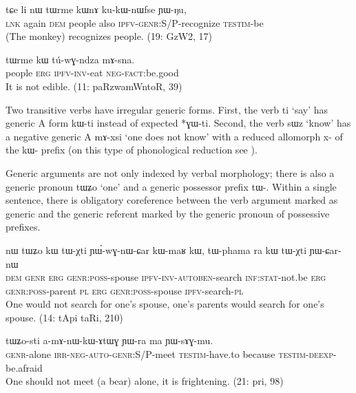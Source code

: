 \documentclass[oldfontcommands,oneside,a4paper,11pt]{article}
\newcommand{\ipa}[1]{{\phon \mbox{#1}}} %
\begin{document}
\begin{exe}
\ex \label{ex:kukWnWfse}
\gll
\ipa{tɕe}  	\ipa{li}  	\ipa{nɯ}  	\ipa{tɯrme}  	\ipa{kɯnɤ}  	\ipa{ku-kɯ-nɯfse}  	\ipa{ɲɯ-ŋu,}\\
\textsc{lnk} again \textsc{dem} people also \textsc{ipfv-genr:S/P}-recognize \textsc{testim}-be\\
\glt  (The monkey) recognizes people. (19: GzW2, 17)
\end{exe}

\begin{exe}
\ex  \label{ex:genr.tWrme}
\gll
\ipa{tɯrme} 	\ipa{kɯ} 	\ipa{tú-wɣ-ndza} 	\ipa{mɤ-sna.} \\
people \textsc{erg} \textsc{ipfv-inv}-eat \textsc{neg-fact}:be.good \\
\glt It is not edible. (11: paRzwamWntoR, 39)
\end{exe}


Two transitive verbs have irregular generic forms. First, the verb \ipa{ti} `say' has generic A form \ipa{kɯ-ti} instead of expected *\ipa{ɣɯ-ti}. Second, the verb \ipa{sɯz} `know' has a negative generic A \ipa{mɤ-xsi} `one does not know' with a reduced allomorph \ipa{x-} of the \ipa{kɯ-} prefix (on this type of phonological reduction see \citealt{jacques14antipassive}).

Generic arguments are not only indexed by verbal morphology; there is also a generic pronoun \ipa{tɯʑo} `one' and a generic possessor prefix \ipa{tɯ-}. Within a single sentence, there is obligatory coreference between the verb argument marked as generic and the generic referent marked by the generic pronoun of possessive prefixes.

\begin{exe}
\ex \label{ex:YWwGnWCar}
\gll
\ipa{nɯ} 	\ipa{tɯʑo} 	\ipa{kɯ} 	\ipa{tɯ-χti} 	\ipa{ɲɯ́-wɣ-nɯ-ɕar} 	\ipa{kɯ-maʁ} 	\ipa{kɯ,} 	\ipa{tɯ-phama} 	\ipa{ra} 	\ipa{kɯ} 	\ipa{tɯ-χti} 	\ipa{ɲɯ-ɕar-nɯ} 	\\
\textsc{dem} \textsc{genr} \textsc{erg} \textsc{genr:poss}-spouse \textsc{ipfv-inv-autoben}-search \textsc{inf:stat}-not.be \textsc{erg} \textsc{genr:poss}-parent \textsc{pl} \textsc{erg} \textsc{genr:poss}-spouse \textsc{ipfv}-search-\textsc{pl} \\
\glt One would not search for one's spouse, one's parents would search for one's spouse. (14: tApi taRi, 210)
\end{exe}


\begin{exe}
\ex \label{ex:YWwGnWCar2}
\gll
\ipa{tɯʑo-sti}  	\ipa{a-mɤ-nɯ-kɯ-ɤtɯɣ}  	\ipa{ɲɯ-ra}  	\ipa{ma}  	\ipa{ɲɯ-sɤɣ-mu.}  \\
\textsc{genr}-alone \textsc{irr-neg-auto-genr:S/P}-meet \textsc{testim}-have.to because \textsc{testim-deexp}-be.afraid \\
\glt One should not meet (a bear) alone, it is frightening. (21: pri, 98)
\end{exe}
\end{document}
